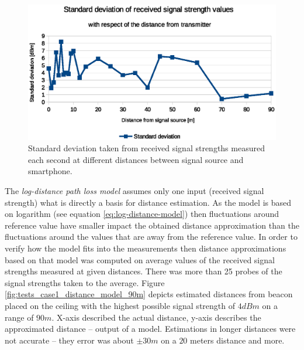 \documentclass[../main.tex]{subfiles}
\begin{document}
\begin{figure}[!htbp]
\includegraphics[width=\textwidth, keepaspectratio]{pictures/tests_case1_fluctuations_over_time_std_dev}
\centering
\caption{Standard deviation taken from received signal strengths measured each second at different distances between signal source and smartphone.}
\label{fig:tests_case1_fluctuations_over_time_std_dev}
\end{figure}

The \textit{log-distance path loss model} assumes only one input (received signal strength) what is directly a basis for distance estimation. As the model is based on logarithm (see equation \ref{eq:log-distance-model}) then fluctuations around reference value have smaller impact the obtained distance approximation than the fluctuations around the values that are away from the reference value. In order to verify how the model fits into the measurements then distance approximations based on that model was computed on average values of the received signal strengths measured at given distances. There was more than 25 probes of the signal strengths taken to the average. Figure \ref{fig:tests_case1_distance_model_90m} depicts estimated distances from beacon placed on the ceiling with the highest possible signal strength of $4dBm$ on a range of $90 m$. X-axis described the actual distance, y-axis describes the approximated distance -- output of a model. Estimations in longer distances were not accurate -- they error was about $\pm 30m$ on a $20$ meters distance and more.
\end{document}
